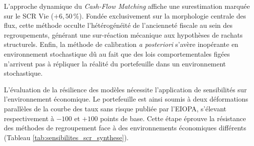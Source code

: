 L'approche dynamique du \textit{Cash-Flow Matching} affiche une surestimation marquée sur le SCR Vie ($+6{,}50\,\%$). Fondée exclusivement sur la morphologie centrale des flux, cette méthode occulte l'hétérogénéité de l'ancienneté fiscale au sein des regroupements, générant une sur-réaction mécanique aux hypothèses de rachats structurels. Enfin, la méthode de calibration \textit{a posteriori} s'avère inopérante en environnement stochastique dû au fait que des lois comportementales figées n'arrivent pas à répliquer la réalité du portefeuille dans un environnement stochastique.

L'évaluation de la résilience des modèles nécessite l'application de sensibilités sur l'environnement économique. Le portefeuille est ainsi soumis à deux déformations parallèles de la courbe des taux sans risque publiée par l'EIOPA, s'élevant respectivement à $-100$ et $+100$ points de base. Cette étape éprouve la résistance des méthodes de regroupement face à des environnements économiques différents (Tableau \ref{tab:sensibilites_scr_synthese}).

\begin{table}[H]
    \centering
    \renewcommand{\arraystretch}{1.4}
    \caption{Erreurs relatives sur le SCR Global et le SCR Rachats selon la déformation de la courbe des taux.}
    \label{tab:sensibilites_scr_synthese}
\end{table}

